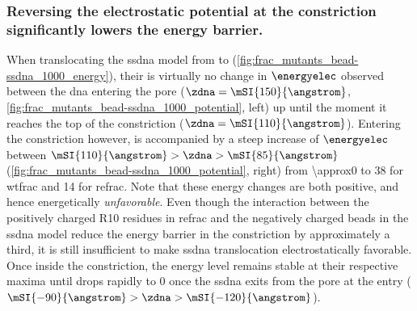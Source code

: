 \subsubsection{Reversing the electrostatic potential at the constriction significantly lowers the energy barrier.}
%
When translocating the \gls{ssdna} model from \cisi{} to \transi{}
(\cref{fig:frac_mutants_bead-ssdna_1000_energy}), their is virtually no change in $\energyelec$ observed
between the \gls{dna} entering the pore ($\zdna = \mSI{150}{\angstrom}$,
\cref{fig:frac_mutants_bead-ssdna_1000_potential}, left) up until the moment it reaches the top of the
constriction ($\zdna = \mSI{110}{\angstrom}$). Entering the constriction however, is accompanied by a steep
increase of $\energyelec$ between $ \mSI{110}{\angstrom} > \zdna > \mSI{85}{\angstrom}$
(\cref{fig:frac_mutants_bead-ssdna_1000_potential}, right) from \SI{\approx0}{\kT} to \SI{38}{\kT} for
\gls{wtfrac} and \SI{14}{\kT} for \gls{refrac}. Note that these energy changes are both positive, and hence
energetically \emph{unfavorable}. Even though the interaction between the positively charged R10 residues in
\gls{refrac} and the negatively charged beads in the \gls{ssdna} model reduce the energy barrier in the
constriction by approximately a third, it is still insufficient to make \gls{ssdna} translocation
electrostatically favorable. Once inside the constriction, the energy level remains stable at their respective
maxima until drops rapidly to \SI{0}{\kT} once the \gls{ssdna} exits from the pore at the \transi{} entry
($\mSI{-90}{\angstrom} > \zdna >  \mSI{-120}{\angstrom}$).

